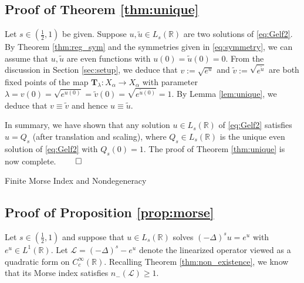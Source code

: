 \documentclass[reqno,10pt,a4paper]{amsart}
\makeatletter
\theoremstyle{definition}
\theoremstyle{definition}
\theoremstyle{remark}
\theoremstyle{remark}
\numberwithin{equation}{section}
\newcommand{\R}{\mathbb{R}}
\newcommand{\Ds}{(-\Delta)^{s}}
\newcommand{\Ts}{\mathbf{T}}
\newcommand{\LL}{\mathcal{L}}
\def\section{\@startsection{section}{1}%
  \z@{1.5\linespacing\@plus\linespacing}{.5\linespacing}%
  {\normalfont\bfseries\large\centering}}
\makeatother
\begin{document}
\subsection{Proof of Theorem \ref{thm:unique}} Let  $s \in (\frac 1 2, 1)$ be given. Suppose $u, \tilde{u} \in L_s(\R)$ are two solutions of \eqref{eq:Gelf2}. By Theorem \ref{thm:reg_sym} and the symmetries given in \eqref{eq:symmetry}, we can assume that $u, \tilde{u}$ are even functions with $u(0)=\tilde{u}(0)=0$. From the discussion in Section \ref{sec:setup}, we deduce that $v := \sqrt{e^u}$ and $\tilde{v} := \sqrt{e^{\tilde{u}}}$ are both fixed points of the map $\Ts_{\lambda} : X_\alpha \to X_\alpha$ with parameter $\lambda=v(0)=\sqrt{e^{u(0)}} = \tilde{v}(0) = \sqrt{e^{\tilde{u}(0)}} = 1$. By Lemma \ref{lem:unique}, we deduce that $v \equiv \tilde{v}$ and hence $u \equiv \tilde{u}$.

In summary, we have shown that any solution $u \in L_s(\R)$ of \eqref{eq:Gelf2} satisfies $u=Q_s$ (after translation and scaling), where $Q_s \in L_s(\R)$ is the unique even solution of \eqref{eq:Gelf2} with $Q_s(0)=1$. The proof of Theorem \ref{thm:unique} is now complete. \hfill $\qed$


\section{Finite Morse Index and Nondegeneracy}

\subsection{Proof of Proposition \ref{prop:morse}}

Let $s \in (\frac 1 2, 1)$ and suppose that $u \in L_s(\R)$ solves $\Ds u = e^u$ with $e^u \in L^1(\R)$. Let $\LL = \Ds - e^u$ denote the linearized operator viewed as a quadratic form on $C^\infty_c(\R)$. Recalling Theorem \ref{thm:non_existence}, we know that its Morse index satisfies $n_-(\LL) \geq 1$.
\end{document}
